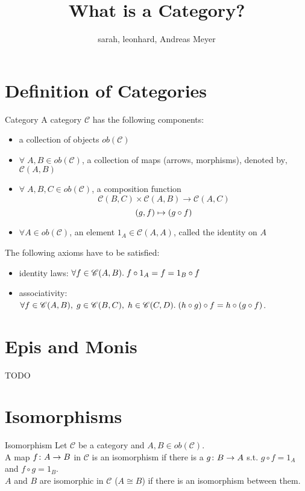 
\def\pathToRoot{../}



\title{What is a Category?}
\author{sarah, leonhard, Andreas Meyer}
\maketitle

\section {Definition of Categories}
\begin{definition}{Category}
	A category $\mathscr{C}$ has the following components:
	\begin{itemize}
		\item a collection of objects $ob(\mathscr{C})$
		\item $\forall \; A, B \in ob(\mathscr{C})$, a collection of maps (arrows, morphisms), denoted by‚ $\mathscr{C}(A, B)$
		\item $\forall \; A, B, C \in ob(\mathscr{C})$, a composition function
		\[\mathscr{C}(B, C) \times \mathscr{C}(A, B) \rightarrow  \mathscr{C}(A, C)
		\]		\[ (g,f) \mapsto (g \mathbin{\circ} f)
		\]
		\item $\forall A \in ob(\mathscr{C})$, an element $1_A \in \mathscr{C}(A, A)$, called the identity on $A$ 
 	\end{itemize}
 The following axioms have to be satisfied:
 \begin{itemize}
 	\item identity laws: $\forall f \in \mathscr{C}(A, B). \; f \mathbin{\circ} 1_A = f = 1_B \mathbin{\circ} f$ 
 	\item associativity: $\forall f \in \mathscr{C}(A, B), \; g \in \mathscr{C}(B, C), \; h \in \mathscr{C}(C, D). \; (h \mathbin{\circ} g) \mathbin{\circ} f = h \mathbin{\circ} (g \mathbin{\circ} f) $.
 \end{itemize}
\end{definition}
\section {Epis and Monis}

TODO

\section {Isomorphisms}
\begin{definition}{Isomorphism}
	Let $\mathscr{C}$ be a category and $A, B \in ob(\mathscr{C})$.
	\\ A map $f \from A \to B$ in $\mathscr{C}$ is an isomorphism if there is a $g \from B \to A$ s.t. $g \circ f = 1_A$ and $f \circ g = 1_B$.
	\\ $A$ and $B$ are isomorphic in $\mathscr{C}$ ($A \cong B$) if there is an isomorphism between them.
\end{definition}


